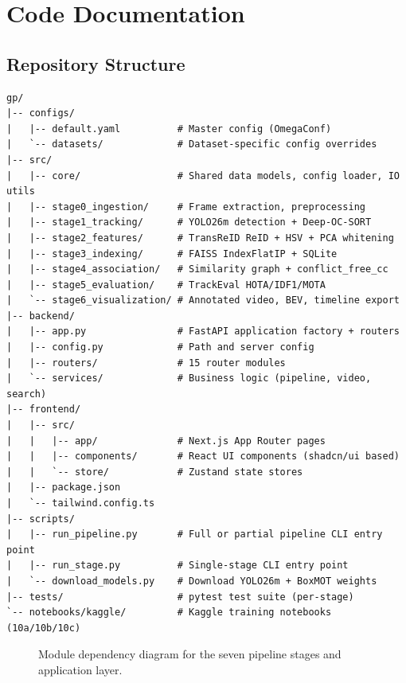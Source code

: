 \chapter{Code Documentation}

\section{Repository Structure}

\begin{verbatim}
gp/
|-- configs/
|   |-- default.yaml          # Master config (OmegaConf)
|   `-- datasets/             # Dataset-specific config overrides
|-- src/
|   |-- core/                 # Shared data models, config loader, IO utils
|   |-- stage0_ingestion/     # Frame extraction, preprocessing
|   |-- stage1_tracking/      # YOLO26m detection + Deep-OC-SORT
|   |-- stage2_features/      # TransReID ReID + HSV + PCA whitening
|   |-- stage3_indexing/      # FAISS IndexFlatIP + SQLite
|   |-- stage4_association/   # Similarity graph + conflict_free_cc
|   |-- stage5_evaluation/    # TrackEval HOTA/IDF1/MOTA
|   `-- stage6_visualization/ # Annotated video, BEV, timeline export
|-- backend/
|   |-- app.py                # FastAPI application factory + routers
|   |-- config.py             # Path and server config
|   |-- routers/              # 15 router modules
|   `-- services/             # Business logic (pipeline, video, search)
|-- frontend/
|   |-- src/
|   |   |-- app/              # Next.js App Router pages
|   |   |-- components/       # React UI components (shadcn/ui based)
|   |   `-- store/            # Zustand state stores
|   |-- package.json
|   `-- tailwind.config.ts
|-- scripts/
|   |-- run_pipeline.py       # Full or partial pipeline CLI entry point
|   |-- run_stage.py          # Single-stage CLI entry point
|   `-- download_models.py    # Download YOLO26m + BoxMOT weights
|-- tests/                    # pytest test suite (per-stage)
`-- notebooks/kaggle/         # Kaggle training notebooks (10a/10b/10c)
\end{verbatim}

\begin{figure}[htbp]
\centering
{}
\caption{Module dependency diagram for the seven pipeline stages and application layer.}
\label{fig:modules}
\end{figure}

